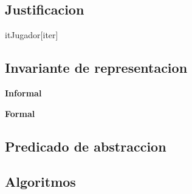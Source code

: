 \begin{Representacion}
\subsection{Justificacion}

	\begin{Estructura}{itJugador}[iter]
		\begin{Tupla}[iter]
		\end{Tupla}
	\end{Estructura}
\subsection{Invariante de representacion}

\textbf{Informal}

\textbf{Formal}

\subsection{Predicado de abstraccion}

\end{Representacion}
\subsection{Algoritmos}


